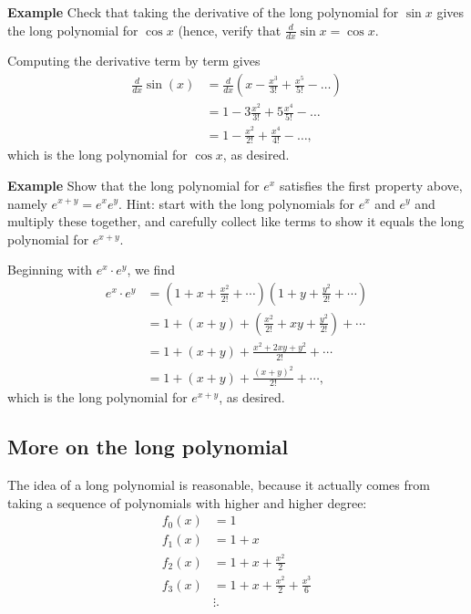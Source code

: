 \documentclass[twoside,openright,titlepage,a4paper]{book}
\begin{document}
\begin{sloppypar}
\textbf{Example} Check that taking the derivative of the long polynomial for ${\sin x}$ gives the long polynomial for ${\cos x}$ (hence, verify that ${\frac{d}{dx} \sin x = \cos x}$.
\begin{examplebox}
Computing the derivative term by term gives
\begin{align*}
\frac{d}{dx} \sin(x) &= \frac{d}{dx} \left(x - \frac{x^3}{3!} + \frac{x^5}{5!} - \ldots \right) \\
&= 1 - 3 \frac{x^2}{3!} + 5 \frac{x^4}{5!} - \ldots \\
&= 1 - \frac{x^2}{2!} + \frac{x^4}{4!} - \ldots,
\end{align*}
which is the long polynomial for ${\cos x}$, as desired.
\end{examplebox}

\textbf{Example} Show that the long polynomial for ${e^x}$ satisfies the first property above, namely ${e^{x+y} = e^x e^y}$. Hint: start with the long polynomials for ${e^x}$ and ${e^y}$ and multiply these together, and carefully collect like terms to show it equals the long polynomial for ${e^{x+y}}$.
\begin{examplebox}
Beginning with ${e^x \cdot e^y}$, we find
\begin{align*}
e^x \cdot e^y &= \left(1+ x + \frac{x^2}{2!} + \dotsb \right) \left(1 + y + \frac{y^2}{2!} + \dotsb \right) \\
&= 1 + (x+y) + \left( \frac{x^2}{2!} + xy + \frac{y^2}{2!} \right) + \dotsb \\
&= 1 + (x+y) + \frac{x^2 + 2xy + y^2}{2!} + \dotsb \\
&= 1 + (x+y) + \frac{(x+y)^2}{2!} + \dotsb,
\end{align*}
which is the long polynomial for ${e^{x+y}}$, as desired.
\end{examplebox}

\subsection{More on the long polynomial}

The idea of a long polynomial is reasonable, because it actually comes from taking a sequence of polynomials with higher and higher degree:
\begin{align*} 
f_0(x) &= 1 \\
f_1(x) &= 1+x \\
f_2(x) &= 1+x+\frac{x^2}{2} \\
f_3(x) &= 1+ x+ \frac{x^2}{2} + \frac{x^3}{6} \\
&\vdots. 
\end{align*}


\end{sloppypar}
\end{document}
